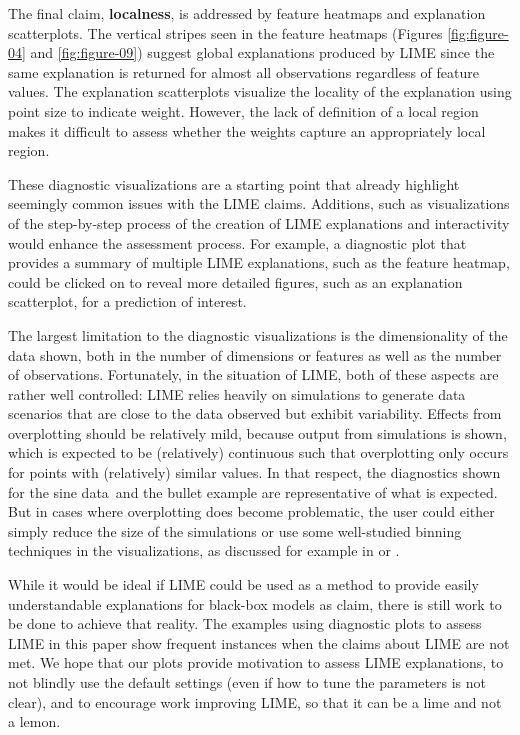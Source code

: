 \documentclass[AMS,STIX2COL]{WileyNJD-v2}\usepackage[]{graphicx}\usepackage[]{color}
\newcommand{\data}{sine data}
\begin{document}
The final claim, \textbf{localness}, is addressed by feature heatmaps and explanation scatterplots. The vertical stripes seen in the feature heatmaps (Figures \ref{fig:figure-04} and \ref{fig:figure-09}) suggest global explanations produced by LIME since the same explanation is returned for almost all observations regardless of feature values. The explanation scatterplots visualize the locality of the explanation using point size to indicate weight. However, the lack of definition of a local region makes it difficult to assess whether the weights capture an appropriately local region.

These diagnostic visualizations are a starting point that already highlight seemingly common issues with the LIME claims. Additions, such as visualizations of the step-by-step process of the creation of LIME explanations and interactivity would enhance the assessment process. For example, a diagnostic plot that provides a summary of multiple LIME explanations, such as the feature heatmap, could be clicked on to reveal more detailed figures, such as an explanation scatterplot, for a prediction of interest.

The largest limitation to the diagnostic visualizations is the dimensionality of the data shown, both in the number of dimensions or features as well as the number of observations. Fortunately, in the situation of LIME, both of these aspects are rather well controlled: LIME relies heavily on simulations to generate data scenarios that are close to the data observed but exhibit variability. Effects from overplotting should be relatively mild, because output from simulations is shown, which is expected to be (relatively) continuous such that overplotting only occurs for points with (relatively) similar values. In that respect, the diagnostics shown for the \data \ and the bullet example are representative of what is expected. But in cases where overplotting does become problematic, the user could either simply reduce the size of the simulations or use some well-studied binning techniques in the visualizations, as discussed for example in \citet{carr:1987} or \citet{unwin:2006}. 

While it would be ideal if LIME could be used as a method to provide easily understandable explanations for black-box models as \citet{ribeiro:2016} claim, there is still work to be done to achieve that reality. The examples using diagnostic plots to assess LIME in this paper show frequent instances when the claims about LIME are not met. We hope that our plots provide motivation to assess LIME explanations, to not blindly use the default settings (even if how to tune the parameters is not clear), and to encourage work improving LIME, so that it can be a lime and not a lemon.
\end{document}
